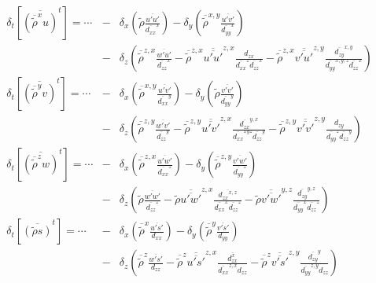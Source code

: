 \begin{eqnarray}
\delta_t \left [ \overline{(\overline{\tilde{\rho}}^x u)}^t \right ]=
\cdots&-&\delta_x(\tilde{\rho}\frac{\overline{u'u'}}{\overline{d_{xx}}^x})
-\delta_y(\overline{\tilde{\rho}}^{x,y}\frac{\overline{u'v'}}{\overline{d_{yy}
}^x}) \nonumber \\
&-&\delta_z(\overline{\tilde{\rho}}^{z,x}\frac{\overline{w'u'}}{\overline
{d_{zz}}^x}
-\overline{\tilde{\rho}}^{z,x}\overline{\overline{u'u'}}^{z,x}
\frac{d_{zx}}{\overline{d_{xx}}^z\overline{d_{zz}}^x}
-\overline{\tilde{\rho}}^{z,x}\overline{\overline{v'u'}}^{z,y}
\frac{\overline{d_{zy}}^{x,y}}{\overline{d_{yy}}^{x,y,z}\overline{d_{zz}}^x}
) \nonumber\\
\delta_t \left [ \overline{(\overline{\tilde{\rho}}^y v)}^t \right ]=
\cdots&-&\delta_x(\overline{\tilde{\rho}}^{x,y}\frac{\overline{u'v'}}
{\overline{d_{xx}}^y})
-\delta_y(\tilde{\rho}\frac{\overline{v'v'}}{\overline{d_{yy}}^y})
\nonumber \\
&-&\delta_z(\overline{\tilde{\rho}}^{z,y}\frac{\overline{w'v'}}{\overline
{d_{zz}}^y}
-\overline{\tilde{\rho}}^{z,y}\overline{\overline{u'v'}}^{z,x}
\frac{\overline{d_{zx}}^{y,x}}{\overline{d_{xx}}^{xyz}\overline{d_{zz}}^y}
-\overline{\tilde{\rho}}^{z,y}\overline{\overline{v'v'}}^{z,y}
\frac{d_{zy}}{\overline{d_{yy}}^z\overline{d_{zz}}^y}
) \nonumber\\
\delta_t \left [ \overline{(\overline{\tilde{\rho}}^z w)}^t \right ]=
\cdots&-&\delta_x(\overline{\tilde{\rho}}^{z,x}\frac{\overline{u'w'}}
{\overline{d_{xx}}^z})
-\delta_y(\overline{\tilde{\rho}}^{z,y}\frac{\overline{v'w'}}{\overline{d_{yy}
}^z})
\nonumber \\
&-&\delta_z(\tilde{\rho}\frac{\overline{w'w'}}{\overline{d_{zz}}^z}
-\tilde{\rho}\overline{\overline{u'w'}}^{z,x}
\frac{\overline{{d_{zx}}^{x,z}}}{\overline{d_{xx}}^x\overline{d_{zz}}^z}
-\tilde{\rho}\overline{\overline{v'w'}}^{y,z}
\frac{\overline{d_{zy}}^{y,z}}{\overline{d_{yy}}^{x}\overline{d_{zz}}^z}
) \nonumber\\
\delta_t \left [ \overline{(\tilde{\rho} s)}^t \right ]=
\cdots&-&\delta_x(\overline{\tilde{\rho}}^x\frac{\overline{u's'}}{d_{xx}})
-\delta_y(\overline{\tilde{\rho}}^y\frac{\overline{v's'}}{d_{yy}})
\nonumber \\
&-&\delta_z(\overline{\tilde{\rho}}^z\frac{\overline{w's'}}{d_{zz}}
-\overline{\tilde{\rho}}^z\overline{\overline{u's'}}^{z,x}
\frac{\overline{d_{zx}^x}}{\overline{d_{xx}}^{z,x}d_{zz}}
-\overline{\tilde{\rho}}^z\overline{\overline{v's'}}^{z,y}
\frac{\overline{d_{zy}}^y}{\overline{d_{yy}}^{z,y}d_{zz}}  )
\label{discturb}
\end{eqnarray}
\\

